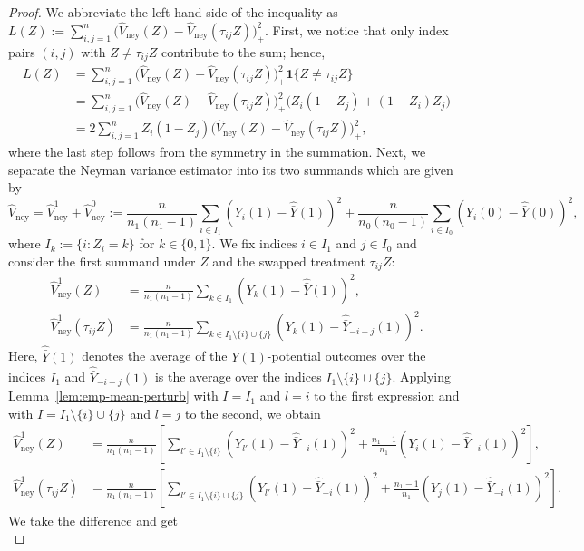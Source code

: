 \documentclass[10pt,a4paper]{amsart}
\newcommand{\one}{\mathbf{1}}
\newcommand{\vhn}{\hat{V}_{\mathrm{ney}}}
\newcommand{\ybh}{\hat{\bar{Y}}}
\begin{document}
\begin{proof}
	We abbreviate the left-hand side of the inequality as $L(Z) := \sum_{i,j=1}^n \big(\vhn(Z)-\vhn(\tau_{ij}Z)\big)_+^2$. First, we notice that only index pairs $(i,j)$ with $Z \neq \tau_{ij} Z$ contribute to the sum; hence,
	\begin{align*}
		L(Z) &= \sum_{i,j=1}^n \big(\vhn(Z)-\vhn(\tau_{ij}Z)\big)_+^2 \one \{Z \neq \tau_{ij} Z\}\\
		&= \sum_{i,j=1}^n \big(\vhn(Z)-\vhn(\tau_{ij}Z)\big)_+^2 \Big(Z_i (1-Z_j) + (1-Z_i)Z_j\Big)\\
		&= 2\sum_{i,j=1}^n Z_i (1-Z_j) \big(\vhn(Z)-\vhn(\tau_{ij}Z)\big)_+^2,
	\end{align*}
	where the last step follows from the symmetry in the summation. Next, we separate the Neyman variance estimator into its two summands which are given by
    \begin{equation*}
        \vhn = \vhn^1+\vhn^0 := \frac{n}{n_1(n_1-1)}\sum_{i \in I_1} (Y_i(1)-\ybh(1))^2 + \frac{n}{n_0(n_0-1)}\sum_{i \in I_0} (Y_i(0)-\ybh(0))^2,
    \end{equation*}
    where $I_k := \{i\colon Z_i=k\}$ for $k\in \{0,1\}$. We fix indices $i\in I_1$ and $j \in I_0$ and consider the first summand under $Z$ and the swapped treatment $\tau_{ij}Z$:
    \begin{align*}
        \vhn^1(Z) &= \frac{n}{n_1(n_1-1)}\sum_{k \in I_1} (Y_k(1)-\ybh(1))^2,\\
        \vhn^1(\tau_{ij}Z) &= \frac{n}{n_1(n_1-1)}\sum_{k \in I_1 \setminus \{i\} \cup \{j\}} (Y_k(1)-\ybh_{-i+j}(1))^2.
    \end{align*}
    Here, $\ybh(1)$ denotes the average of the $Y(1)$-potential outcomes over the indices $I_1$ and $\ybh_{-i+j}(1)$ is the average over the indices $I_1\setminus\{i\} \cup \{j\}$. Applying Lemma~\ref{lem:emp-mean-perturb} with $I = I_1$ and $l=i$ to the first expression and with $I=I_1 \setminus \{i\} \cup \{j\}$ and $l=j$ to the second, we obtain
    \begin{align*}
        \vhn^1(Z) &= \frac{n}{n_1(n_1-1)}\left[\sum_{l' \in I_1 \setminus\{i\}} (Y_{l'}(1)-\ybh_{-i}(1))^2 + \frac{n_1-1}{n_1}(Y_i(1)-\ybh_{-i}(1))^2\right],\\
        \vhn^1(\tau_{ij}Z) &= \frac{n}{n_1(n_1-1)} \left[\sum_{l' \in I_1 \setminus \{i\} \cup \{j\}} (Y_{l'}(1)-\ybh_{-i}(1))^2 + \frac{n_1-1}{n_1} (Y_j(1)-\ybh_{-i}(1))^2\right].
    \end{align*}
    We take the difference and get
    \begin{equation*}

\end{equation*}
\end{proof}
\end{document}
